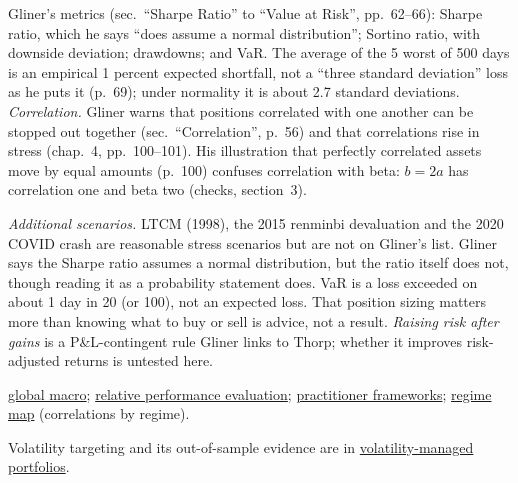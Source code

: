 \begin{qfmethod}
 Gliner's metrics (sec.\ ``Sharpe Ratio'' to ``Value at Risk'', pp.~62--66): Sharpe ratio, which he says ``does assume a normal distribution''; Sortino ratio, with downside deviation; drawdowns; and VaR. The average of the 5 worst of 500 days is an empirical 1 percent expected shortfall, not a ``three standard deviation'' loss as he puts it (p.~69); under normality it is about 2.7 standard deviations. \emph{Correlation.} Gliner warns that positions correlated with one another can be stopped out together (sec.\ ``Correlation'', p.~56) and that correlations rise in stress (chap.~4, pp.~100--101). His illustration that perfectly correlated assets move by equal amounts (p.~100) confuses correlation with beta: $b=2a$ has correlation one and beta two (checks, section~3).

 \emph{Additional scenarios.} LTCM (1998), the 2015 renminbi devaluation and the 2020 COVID crash are reasonable stress scenarios but are not on Gliner's list. Gliner says the Sharpe ratio assumes a normal distribution, but the ratio itself does not, though reading it as a probability statement does. VaR is a loss exceeded on about 1 day in 20 (or 100), not an expected loss. That position sizing matters more than knowing what to buy or sell is advice, not a result. \emph{Raising risk after gains} is a P\&L-contingent rule Gliner links to Thorp; whether it improves risk-adjusted returns is untested here.

 \hyperref[def:global-macro-strategy]{global macro}; \hyperref[meth:relative-performance-evaluation]{relative performance evaluation}; \hyperref[meth:macro-practitioner-frameworks]{practitioner frameworks}; \hyperref[def:macro-regime-asset-map]{regime map} (correlations by regime).

 Volatility targeting and its out-of-sample evidence are in \hyperref[ev:volatility-managed-portfolios]{volatility-managed portfolios}.

\end{qfmethod}

